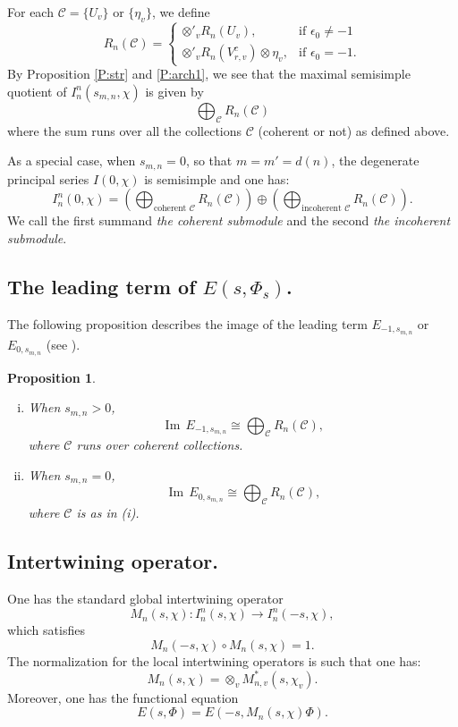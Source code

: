 \documentclass[10pt]{amsart}
\theoremstyle{plain}
\newtheorem{Prop}[equation]{Proposition}
\numberwithin{equation}{section}
\begin{document}
 \vskip 5pt
 

For each $\mathcal{C}=\{U_v\}$ or $\{\eta_v\}$, we define
\[
R_n(\mathcal{C})=\begin{cases}\otimes'_v R_n(U_v),&\text{if
    $\epsilon_0\neq -1$}\\
\otimes'_v R_n(V^c_{r,v})\otimes\eta_v,&\text{if $\epsilon_0=-1$}.
\end{cases}
\]
By Proposition \ref{P:str} and \ref{P:arch1}, we see that  the maximal semisimple
 quotient of $I^n_n(s_{m,n},\chi)$ is given by
 \[  \bigoplus_{ \mathcal{C}  }   R_n(\mathcal{C}) \]
 where the sum runs over all the collections $\mathcal{C}$ (coherent or
 not) as defined above.
 \vskip 5pt

 
 
 \vskip 5pt
 
 As a special case, when $s_{m,n} = 0$, so that $ m = m' = d(n)$, the
 degenerate principal series $I(0,\chi)$ is semisimple and one has:
 \[  
I_n^n(0,\chi) = \left( \bigoplus_{\text{coherent
      $\mathcal{C}$}}R_n(\mathcal{C}) \right) \oplus \left(
  \bigoplus_{\text{incoherent $\mathcal{C}$}}R_n(\mathcal{C})\right).
\]
We call the first summand {\em the coherent submodule} and the second
{\em the incoherent submodule}.

\vskip 5pt

\subsection{\bf The leading term of $E(s,\Phi_s)$.}
 The following proposition describes the image of the leading term
 $E_{-1, s_{m,n}}$ or $E_{0, s_{m,n}}$ (see \cite{KR3,KR5, GT, T2, Y4}). 
 \vskip 5pt

 \begin{Prop}  \label{P:E-1}
\begin{enumerate}[(i)]
 \item When $s_{m,n} > 0$, 
 \[  {\operatorname{Im\,}} E_{-1, s_{m,n}} \cong  \bigoplus_\mathcal{C}   R_n(\mathcal{C}), \]
 where $\mathcal{C}$ runs over coherent collections.
 \vskip 5pt
 
 \item When $s_{m,n} = 0$, 
 \[   {\operatorname{Im\,}} E_{0, s_{m,n}} \cong  \bigoplus_\mathcal{C}  R_n(\mathcal{C}), \]
where $\mathcal{C}$ is as in (i).
\end{enumerate}
\end{Prop}
\vskip 5pt
  
 \subsection{\bf Intertwining operator.}
 One has the standard global intertwining operator 
 \[ M_n(s,\chi):  I^n_n(s,\chi) \longrightarrow I^n_n(-s, \chi), \]
which satisfies 
 \[ M_n(-s,\chi)\circ M_n(s,\chi) = 1.\]
 The normalization for the local intertwining operators is such that one has:
 \[  M_n(s, \chi) = \otimes_v M_{n,v}^*(s, \chi_v). \]
 Moreover, one has the functional equation
 \[  E(s, \Phi) =  E(-s,  M_n(s, \chi) \Phi). \]
\vskip 5pt
\end{document}
